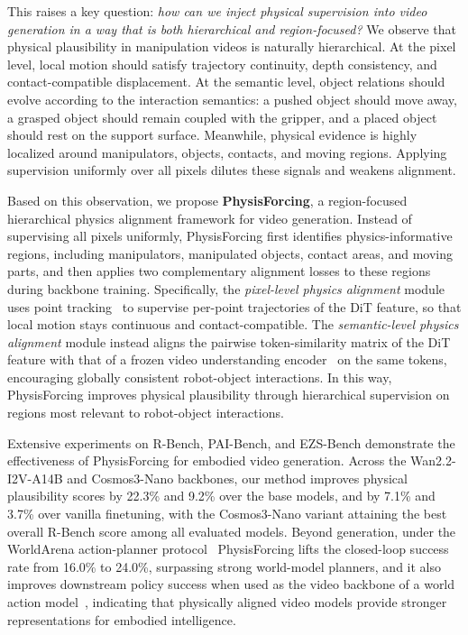 \documentclass{llmxive}
\begin{document}
This raises a key question: \textit{how can we inject physical supervision into video generation in a way that is both hierarchical and region-focused?} We observe that physical plausibility in manipulation videos is naturally hierarchical. At the pixel level, local motion should satisfy trajectory continuity, depth consistency, and contact-compatible displacement. At the semantic level, object relations should evolve according to the interaction semantics: a pushed object should move away, a grasped object should remain coupled with the gripper, and a placed object should rest on the support surface. Meanwhile, physical evidence is highly localized around manipulators, objects, contacts, and moving regions. Applying supervision uniformly over all pixels dilutes these signals and weakens alignment.

Based on this observation, we propose \textbf{PhysisForcing}, a region-focused hierarchical physics alignment framework for video generation. Instead of supervising all pixels uniformly, PhysisForcing first identifies physics-informative regions, including manipulators, manipulated objects, contact areas, and moving parts, and then applies two complementary alignment losses to these regions during backbone training. Specifically, the \textit{pixel-level physics alignment} module uses point tracking~\cite{karaev24cotracker3} to supervise per-point trajectories of the DiT feature, so that local motion stays continuous and contact-compatible. The \textit{semantic-level physics alignment} module instead aligns the pairwise token-similarity matrix of the DiT feature with that of a frozen video understanding encoder~\cite{bardes2024revisiting} on the same tokens, encouraging globally consistent robot-object interactions. In this way, PhysisForcing improves physical plausibility through hierarchical supervision on regions most relevant to robot-object interactions.

Extensive experiments on R-Bench, PAI-Bench, and EZS-Bench demonstrate the effectiveness of PhysisForcing for embodied video generation. Across the Wan2.2-I2V-A14B and Cosmos3-Nano backbones, our method improves physical plausibility scores by 22.3\% and 9.2\% over the base models, and by 7.1\% and 3.7\% over vanilla finetuning, with the Cosmos3-Nano variant attaining the best overall R-Bench score among all evaluated models. Beyond generation, under the WorldArena action-planner protocol~\cite{shang2026worldarena} PhysisForcing lifts the closed-loop success rate from 16.0\% to 24.0\%, surpassing strong world-model planners, and it also improves downstream policy success when used as the video backbone of a world action model~\cite{yuan2026fastwam}, indicating that physically aligned video models provide stronger representations for embodied intelligence.
\end{document}
